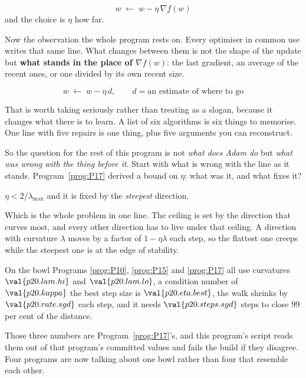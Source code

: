 \begin{fr}
\begin{ansblock}
\[ w \;\leftarrow\; w - \eta\,\nabla f(w) \]
and the choice is $\eta$ \dash{} how far.
\end{ansblock}

Now the observation the whole program rests on. Every optimiser in common use
writes that same line. What changes between them is not the shape of the
update but \textbf{what stands in the place of $\nabla f(w)$}: the last
gradient, an average of the recent ones, or one divided by its own recent
size.

\[ w \;\leftarrow\; w - \eta\,d, \qquad d = \text{an estimate of where to go} \]

\end{fr}

\begin{fr}
That is worth taking seriously rather than treating as a slogan, because it
changes what there is to learn. A list of six algorithms is six things to
memorise. One line with five repairs is one thing, plus five arguments you can
reconstruct.

So the question for the rest of this program is not \emph{what does Adam do}
but \emph{what was wrong with the thing before it}. Start with what is wrong
with the line as it stands. Program~\ref{prog:P17} derived a bound on $\eta$:
what was it, and what fixes it?
\dotline
\nextframe
\end{fr}

\begin{fr}
\begin{ansblock}
$\eta < 2/\lambda_{\max}$ \dash{} and it is fixed by the \emph{steepest}
direction.
\end{ansblock}

Which is the whole problem in one line. The ceiling is set by the direction
that curves most, and every other direction has to live under that ceiling. A
direction with curvature $\lambda$ moves by a factor of $1 - \eta\lambda$ each
step, so the flattest one creeps while the steepest one is at the edge of
stability.

On the bowl Programs \ref{prog:P10}, \ref{prog:P15} and \ref{prog:P17} all
use \dash{} curvatures $\val{p20.lam.hi}$ and $\val{p20.lam.lo}$, a condition
number of $\val{p20.kappa}$ \dash{} the best step size is
$\val{p20.eta.best}$, the walk shrinks by $\val{p20.rate.sgd}$ each step, and
it needs $\val{p20.steps.sgd}$ steps to close $99$ per cent of the distance.

\begin{note}
Those three numbers are Program~\ref{prog:P17}'s, and this program's script
reads them out of that program's committed values and fails the build if they
disagree. Four programs are now talking about one bowl rather than four that
resemble each other.
\end{note}
\end{fr}


